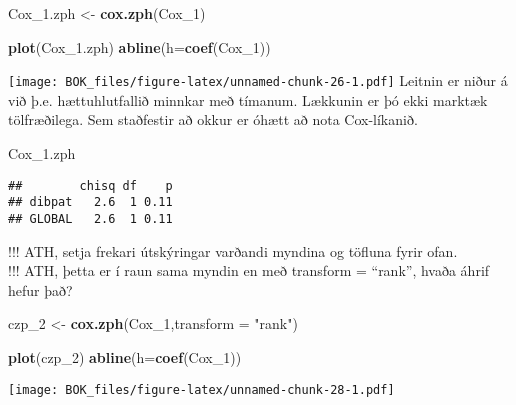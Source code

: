 \documentclass[
]{book}
\newenvironment{Shaded}{\begin{snugshade}}{\end{snugshade}}
\newcommand{\DataTypeTok}[1]{\textcolor[rgb]{0.13,0.29,0.53}{#1}}
\newcommand{\DecValTok}[1]{\textcolor[rgb]{0.00,0.00,0.81}{#1}}
\newcommand{\FloatTok}[1]{\textcolor[rgb]{0.00,0.00,0.81}{#1}}
\newcommand{\KeywordTok}[1]{\textcolor[rgb]{0.13,0.29,0.53}{\textbf{#1}}}
\newcommand{\NormalTok}[1]{#1}
\newcommand{\StringTok}[1]{\textcolor[rgb]{0.31,0.60,0.02}{#1}}
\begin{document}
\begin{Shaded}
\begin{Highlighting}[]
\NormalTok{Cox\_}\FloatTok{1.}\NormalTok{zph <{-}}\StringTok{ }\KeywordTok{cox.zph}\NormalTok{(Cox\_}\DecValTok{1}\NormalTok{)}
\end{Highlighting}
\end{Shaded}

\begin{Shaded}
\begin{Highlighting}[]
\KeywordTok{plot}\NormalTok{(Cox\_}\FloatTok{1.}\NormalTok{zph)}
\KeywordTok{abline}\NormalTok{(}\DataTypeTok{h=}\KeywordTok{coef}\NormalTok{(Cox\_}\DecValTok{1}\NormalTok{))}
\end{Highlighting}
\end{Shaded}

\texttt{[image: BOK\_files/figure-latex/unnamed-chunk-26-1.pdf]}
Leitnin er niður á við þ.e. hættuhlutfallið minnkar með tímanum. Lækkunin er þó ekki marktæk tölfræðilega. Sem staðfestir að okkur er óhætt að nota Cox-líkanið.

\begin{Shaded}
\begin{Highlighting}[]
\NormalTok{Cox\_}\FloatTok{1.}\NormalTok{zph}
\end{Highlighting}
\end{Shaded}

\begin{verbatim}
##        chisq df    p
## dibpat   2.6  1 0.11
## GLOBAL   2.6  1 0.11
\end{verbatim}

!!! ATH, setja frekari útskýringar varðandi myndina og töfluna fyrir ofan.\\
!!! ATH, þetta er í raun sama myndin en með transform = ``rank'', hvaða áhrif hefur það?

\begin{Shaded}
\begin{Highlighting}[]
\NormalTok{czp\_}\DecValTok{2}\NormalTok{ <{-}}\StringTok{ }\KeywordTok{cox.zph}\NormalTok{(Cox\_}\DecValTok{1}\NormalTok{,}\DataTypeTok{transform =} \StringTok{"rank"}\NormalTok{)}

\KeywordTok{plot}\NormalTok{(czp\_}\DecValTok{2}\NormalTok{)}
\KeywordTok{abline}\NormalTok{(}\DataTypeTok{h=}\KeywordTok{coef}\NormalTok{(Cox\_}\DecValTok{1}\NormalTok{))}
\end{Highlighting}
\end{Shaded}

\texttt{[image: BOK\_files/figure-latex/unnamed-chunk-28-1.pdf]}
\end{document}

